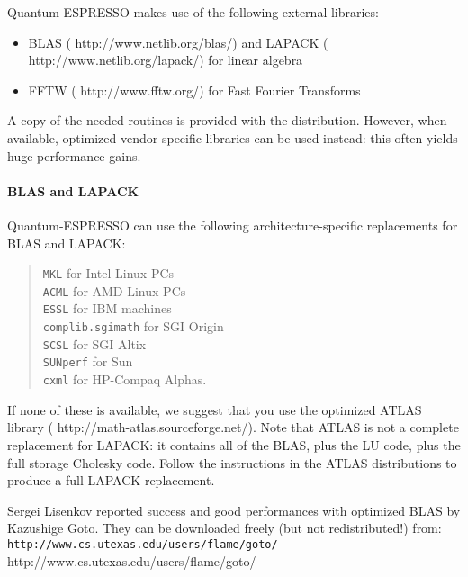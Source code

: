 \documentclass[12pt,a4paper]{article}
\begin{document}
Quantum-ESPRESSO makes use of the following external libraries:
\begin{itemize}
  \item BLAS
        (%
                           {http://www.netlib.org/blas/})
        and LAPACK\hfill\break
        (%
                           {http://www.netlib.org/lapack/})
        for linear algebra
  \item FFTW
        (%
                           {http://www.fftw.org/})
        for Fast Fourier Transforms
\end{itemize}
A copy of the needed routines is provided with the distribution.
However, when available, optimized vendor-specific libraries can be
used instead: this often yields huge performance gains.

\paragraph{BLAS and LAPACK}

Quantum-ESPRESSO can use the following architecture-specific replacements for
BLAS and LAPACK:
\begin{quote}
  \texttt{MKL} for Intel Linux PCs\\
  \texttt{ACML} for AMD Linux PCs\\
  \texttt{ESSL} for IBM machines\\
  \texttt{complib.sgimath} for SGI Origin\\
  \texttt{SCSL} for SGI Altix\\
  \texttt{SUNperf} for Sun\\
  \texttt{cxml} for HP-Compaq Alphas.
\end{quote}
If none of these is available, we suggest that you use the optimized
ATLAS library
(%
                   {http://math-atlas.sourceforge.net/}).
Note that ATLAS is not a complete replacement for LAPACK: it contains
all of the BLAS, plus the LU code, plus the full storage Cholesky
code.  Follow the instructions in the ATLAS distributions to produce a
full LAPACK replacement.

Sergei Lisenkov reported success and good performances with
optimized BLAS by Kazushige Goto.
They can be downloaded freely (but not redistributed!) from:
\htmladdnormallink%
{\texttt{http://www.cs.utexas.edu/users/flame/goto/}}%
{http://www.cs.utexas.edu/users/flame/goto/}
\end{document}
